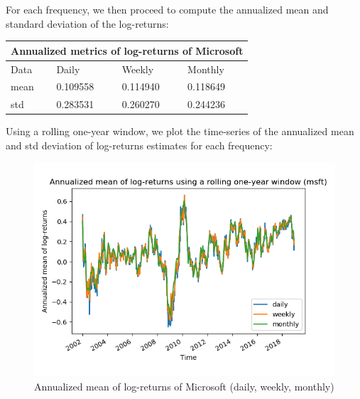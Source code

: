\documentclass[10pt]{article}
\newenvironment{exercise}[2][Exercise]{\begin{trivlist}
  \item[\hskip \labelsep {\bfseries #1}\hskip \labelsep {\bfseries #2.}]}{\end{trivlist}}
\begin{document}
\begin{exercise}{4}
	\bigbreak	
	
	For each frequency, we then proceed to compute the annualized mean and standard deviation of the log-returns:
	
	\bigbreak
	
	\begin{tabular}{ |p{3cm}||p{3cm}|p{3cm}|p{3cm}|  }
		\hline
	 	\multicolumn{4}{|c|}{Annualized metrics of log-returns of Microsoft} \\
	 	\hline
	 	Data & Daily & Weekly & Monthly\\
 		\hline
 		mean  &  0.109558 & 0.114940 & 0.118649\\
 		std & 0.283531 & 0.260270 & 0.244236\\
 		\hline
	\end{tabular}
	
	\bigbreak	
	
	Using a rolling one-year window, we plot the time-series of the annualized mean and std deviation of log-returns estimates for each frequency:
	
	\begin{figure}[H]
	
		\centering
		\includegraphics[scale=0.5]{Figures/problem4d_mean_msft.png}	
		\caption{Annualized mean of log-returns of Microsoft (daily, weekly, monthly)}	
		\label{fig:problem3d_mean_msft}
	
	\end{figure}
	
	\begin{figure}[H]
	

\end{figure}
\end{exercise}
\end{document}
